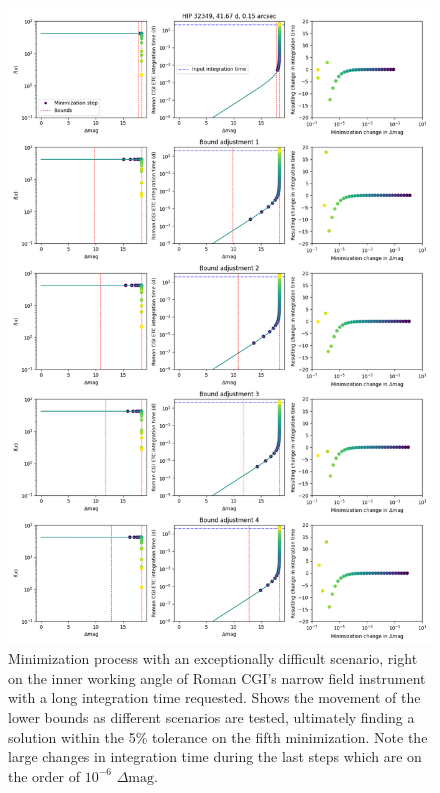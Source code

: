 \begin{figure}
  \begin{center}
    \includegraphics[height=0.75\textheight]{ch2/figures/minimzation_bound_comp.png}
  \end{center}
  \caption{Minimization process with an exceptionally difficult scenario, right on the inner
  working angle of Roman CGI's narrow field instrument with a long integration time requested.
  Shows the movement of the lower bounds as different scenarios are tested, ultimately finding
  a solution within the 5\% tolerance on the fifth minimization. Note the large changes in integration
  time during the last steps which are on the order of $10^{-6}$ $\Delta\textrm{mag}$.}
  \label{fig:minimzation_bound_comp}
\end{figure}

